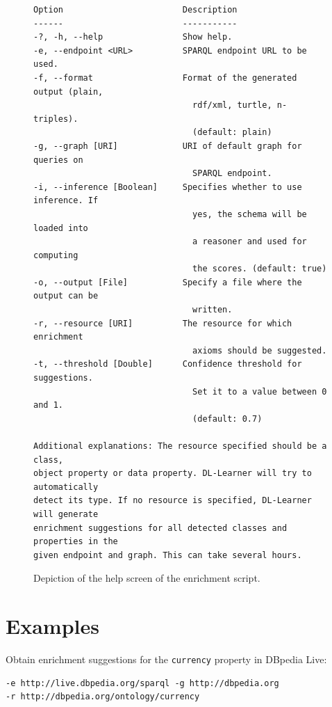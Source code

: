 \documentclass[a4paper,12pt]{scrartcl}
\begin{document}
\begin{figure}[tbh]
\begin{verbatim}
Option                        Description                            
------                        -----------                            
-?, -h, --help                Show help.                             
-e, --endpoint <URL>          SPARQL endpoint URL to be used.        
-f, --format                  Format of the generated output (plain, 
                                rdf/xml, turtle, n-triples).         
                                (default: plain)                     
-g, --graph [URI]             URI of default graph for queries on    
                                SPARQL endpoint.                     
-i, --inference [Boolean]     Specifies whether to use inference. If 
                                yes, the schema will be loaded into  
                                a reasoner and used for computing    
                                the scores. (default: true)          
-o, --output [File]           Specify a file where the output can be 
                                written.                             
-r, --resource [URI]          The resource for which enrichment      
                                axioms should be suggested.          
-t, --threshold [Double]      Confidence threshold for suggestions.  
                                Set it to a value between 0 and 1.   
                                (default: 0.7)                       

Additional explanations: The resource specified should be a class, 
object property or data property. DL-Learner will try to automatically 
detect its type. If no resource is specified, DL-Learner will generate 
enrichment suggestions for all detected classes and properties in the 
given endpoint and graph. This can take several hours.
\end{verbatim}
\caption{Depiction of the help screen of the enrichment script.}
\label{fig:cli}
\end{figure}

\section*{Examples}

Obtain enrichment suggestions for the \verb|currency| property in DBpedia Live:
\begin{verbatim}
-e http://live.dbpedia.org/sparql -g http://dbpedia.org 
-r http://dbpedia.org/ontology/currency
\end{verbatim}
\end{document}
